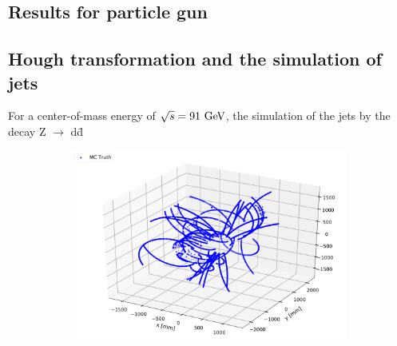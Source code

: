\documentclass{cernatsnote}
\begin{document}
\subsection{Results for particle gun}
\subsection{Hough transformation and the simulation of jets}

For a center-of-mass energy of $\sqrt{s} = 91 \,\mathrm{\,Ge\kern -0.1em V}$, the simulation of the jets by the decay Z $\rightarrow$ d\={d}

\begin{figure}[ht]
	\centering
	\begin{subfigure}[b]{0.3\textwidth}
        \includegraphics[width=\textwidth]{figures/Zdd_3D.pdf}
        \caption{}


\end{subfigure}
\end{figure}
\end{document}
